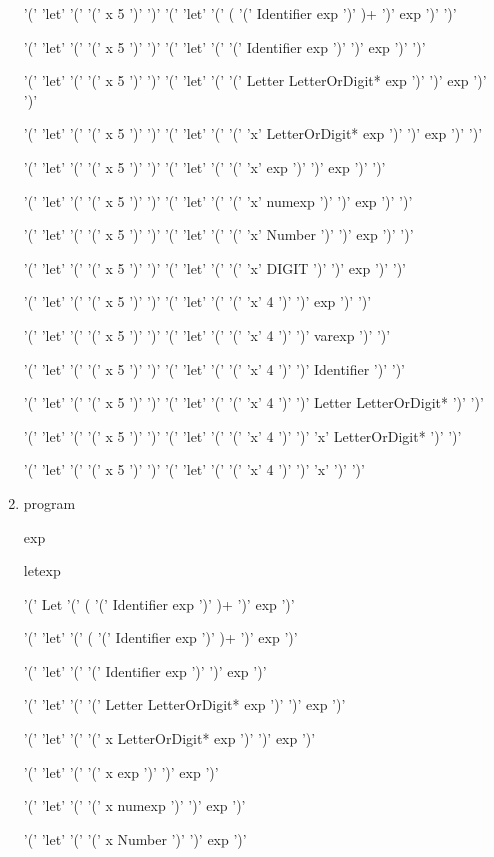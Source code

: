 \documentclass[11pt]{article}
\begin{document}
\begin{enumerate}
	'(' 'let' '(' '(' x 5 ')' ')' '(' 'let' '(' ( '(' Identifier exp ')' )+ ')' exp ')' ')'

	'(' 'let' '(' '(' x 5 ')' ')' '(' 'let' '(' '(' Identifier exp ')' ')' exp ')' ')'

	'(' 'let' '(' '(' x 5 ')' ')' '(' 'let' '(' '(' Letter LetterOrDigit* exp ')' ')' exp ')' ')'

	'(' 'let' '(' '(' x 5 ')' ')' '(' 'let' '(' '(' 'x' LetterOrDigit* exp ')' ')' exp ')' ')'

	'(' 'let' '(' '(' x 5 ')' ')' '(' 'let' '(' '(' 'x' exp ')' ')' exp ')' ')'

	'(' 'let' '(' '(' x 5 ')' ')' '(' 'let' '(' '(' 'x' numexp ')' ')' exp ')' ')'

	'(' 'let' '(' '(' x 5 ')' ')' '(' 'let' '(' '(' 'x' Number ')' ')' exp ')' ')'

	'(' 'let' '(' '(' x 5 ')' ')' '(' 'let' '(' '(' 'x' DIGIT ')' ')' exp ')' ')'

	'(' 'let' '(' '(' x 5 ')' ')' '(' 'let' '(' '(' 'x' 4 ')' ')' exp ')' ')'

	'(' 'let' '(' '(' x 5 ')' ')' '(' 'let' '(' '(' 'x' 4 ')' ')' varexp ')' ')'

	'(' 'let' '(' '(' x 5 ')' ')' '(' 'let' '(' '(' 'x' 4 ')' ')' Identifier ')' ')'

	'(' 'let' '(' '(' x 5 ')' ')' '(' 'let' '(' '(' 'x' 4 ')' ')' Letter LetterOrDigit* ')' ')'

	'(' 'let' '(' '(' x 5 ')' ')' '(' 'let' '(' '(' 'x' 4 ')' ')' 'x' LetterOrDigit* ')' ')'

	'(' 'let' '(' '(' x 5 ')' ')' '(' 'let' '(' '(' 'x' 4 ')' ')' 'x' ')' ')'

	\item program

	exp

	letexp

	'(' Let '(' ( '(' Identifier exp ')' )+ ')' exp ')'

	'(' 'let' '(' ( '(' Identifier exp ')' )+ ')' exp ')'

	'(' 'let' '(' '(' Identifier exp ')' ')' exp ')'

	'(' 'let' '(' '(' Letter LetterOrDigit* exp ')' ')' exp ')'

	'(' 'let' '(' '(' x LetterOrDigit* exp ')' ')' exp ')'

	'(' 'let' '(' '(' x exp ')' ')' exp ')'

	'(' 'let' '(' '(' x numexp ')' ')' exp ')'

	'(' 'let' '(' '(' x Number ')' ')' exp ')'


\end{enumerate}
\end{document}
